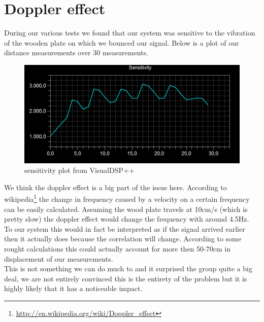 \section{Doppler effect}
During our various tests we found that our system was sensitive to the vibration of the wooden plate on which we bounced our signal. Below is a plot of our distance measurements over 30 measurements.\\
\begin{figure}[H]
\centering
\includegraphics[width=.8\textwidth]{billeder/sensitivity}
\caption{sensitivity plot from VisualDSP++}
\end{figure}
We think the doppler effect is a big part of the issue here. According to wikipedia\footnote{\url{http://en.wikipedia.org/wiki/Doppler_effect}} the change in frequency caused by a velocity on a certain frequency can be easily calculated. Assuming the wood plate travels at 10cm/s (which is pretty slow) the doppler effect would change the frequency with around 4.5Hz.\\
To our system this would in fact be interpreted as if the signal arrived earlier then it actually does because the correlation will change. According to some rought calculations this could actually account for more then 50-70cm in displacement of our measurements.\\
This is not something we can do much to and it surprised the group quite a big deal, we are not entirely convinced this is the entirety of the problem but it is highly likely that it has a noticeable impact.\\
